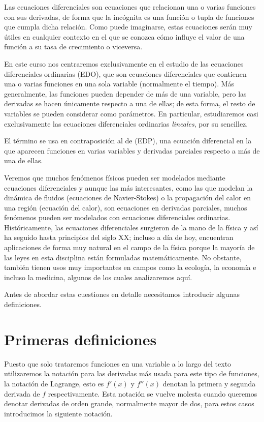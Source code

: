 \documentclass[../ecuaciones_diferenciales.tex]{subfiles}
\begin{document}
Las ecuaciones diferenciales son ecuaciones que relacionan una o varias
funciones con sus derivadas, de forma que la incógnita es una función o tupla de
funciones que cumpla dicha relación. Como puede imaginarse, estas ecuaciones
serán muy útiles en cualquier contexto en el que se conozca cómo influye el
valor de una función a su tasa de crecimiento o viceversa.

En este curso nos centraremos exclusivamente en el estudio de las ecuaciones
diferenciales ordinarias (EDO), que son ecuaciones diferenciales que contienen
una o varias funciones en una sola variable (normalmente el tiempo). Más
generalmente, las funciones pueden depender de más de una variable, pero las
derivadas se hacen únicamente respecto a una de ellas; de esta forma, el resto
de variables se pueden considerar como parámetros. En particular, estudiaremos
casi exclusivamente las ecuaciones diferenciales ordinarias \emph{lineales}, por
su sencillez.

El término  se usa en contraposición
al de  (EDP), una ecuación
diferencial en la que aparecen funciones en varias variables y derivadas
parciales respecto a más de una de ellas.

Veremos que muchos fenómenos físicos pueden ser modelados mediante ecuaciones
diferenciales y aunque las más interesantes, como las que modelan la dinámica de
fluidos (ecuaciones de Navier-Stokes) o la propagación del calor en una región
(ecuación del calor), son ecuaciones en derivadas parciales, muchos fenómenos
pueden ser modelados con ecuaciones diferenciales ordinarias. Históricamente,
las ecuaciones diferenciales surgieron de la mano de la física y así ha seguido
hasta principios del siglo XX; incluso a día de hoy, encuentran aplicaciones de
forma muy natural en el campo de la física porque la mayoría de las leyes en
esta disciplina están formuladas matemáticamente. No obstante, también tienen
usos muy importantes en campos como la ecología, la economía e incluso la
medicina, algunos de los cuales analizaremos aquí.

Antes de abordar estas cuestiones en detalle necesitamos introducir algunas
definiciones.

\section{Primeras definiciones}

Puesto que solo trataremos funciones en una variable a lo largo del texto
utilizaremos la notación para las derivadas más usada para este tipo de
funciones, la notación de Lagrange, esto es \(f'(x)\) y \(f''(x)\) denotan la 
primera y segunda derivada de \(f\) respectivamente. Esta notación se vuelve
molesta cuando queremos denotar derivadas de orden grande, normalmente mayor de
dos, para estos casos introducimos la siguiente notación.
\end{document}
